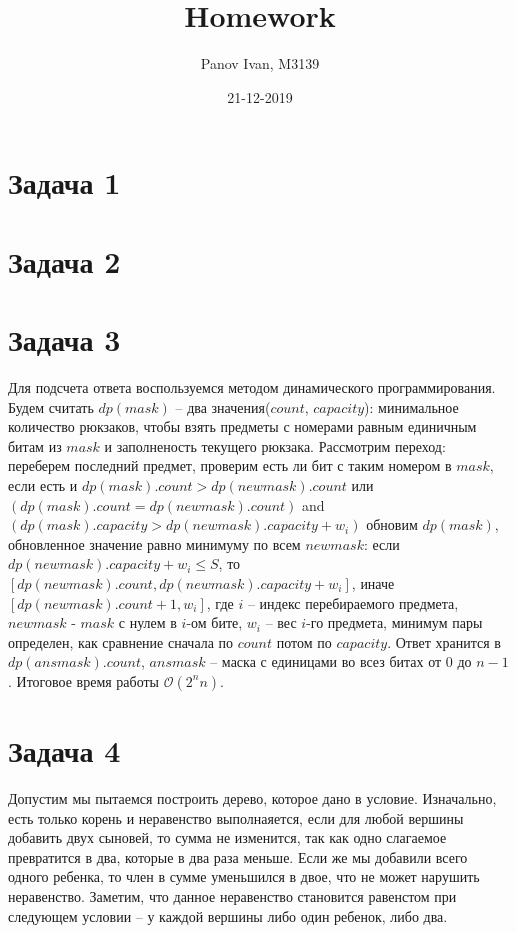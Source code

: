 \documentclass{article}
\title{Homework}
\date{21-12-2019}
\author{Panov Ivan, M3139}
\begin{document}
	
	\maketitle
	\newpage
	
	\section*{Задача 1}
		
	\section*{Задача 2}	
	
	\section*{Задача 3}
	Для подсчета ответа воспользуемся методом динамического программирования. Будем считать $dp(mask)$ -- два значения($count$, $capacity$): минимальное количество рюкзаков, чтобы взять предметы с номерами равным единичным битам из $mask$ и заполненость текущего рюкзака. Рассмотрим переход: переберем последний предмет, проверим есть ли бит с таким номером в $mask$, если есть и $dp(mask).count > dp(newmask).count$ или $(dp(mask).count = dp(newmask).count)$ and $(dp(mask).capacity > dp(newmask).capacity + w_i)$ обновим $dp(mask)$, обновленное значение равно минимуму по всем $newmask$: если $dp(newmask).capacity + w_i \le S$, то $[dp(newmask).count, dp(newmask).capacity + w_i]$, иначе $[dp(newmask).count + 1, w_i]$, где $i$ -- индекс перебираемого предмета, $newmask$ - $mask$ с нулем в $i$-ом бите, $w_i$ -- вес $i$-го предмета, минимум пары определен, как сравнение сначала по $count$ потом по $capacity$. Ответ хранится в $dp(ansmask).count$, $ansmask$ -- маска с единицами во всез битах от $0$ до $n - 1$. Итоговое время работы $\mathcal{O}(2^nn)$.
	
	\section*{Задача 4}
	 Допустим мы пытаемся построить дерево, которое дано в условие. Изначально, есть только корень и неравенство выполнаяется, если для любой вершины добавить двух сыновей, то сумма не изменится, так как одно слагаемое превратится в два, которые в два раза меньше. Если же мы добавили всего одного ребенка, то член в сумме уменьшился в двое, что не может нарушить неравенство. Заметим, что данное неравенство становится равенстом при следующем условии -- у каждой вершины либо один ребенок, либо два.
	
\end{document}
